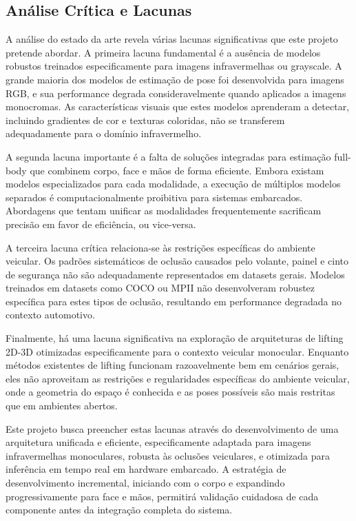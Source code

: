 \documentclass[12pt, a4paper]{article}
\begin{document}
\subsection{Análise Crítica e Lacunas}

A análise do estado da arte revela várias lacunas significativas que este projeto pretende abordar. A primeira lacuna fundamental é a ausência de modelos robustos treinados especificamente para imagens infravermelhas ou grayscale. A grande maioria dos modelos de estimação de pose foi desenvolvida para imagens RGB, e sua performance degrada consideravelmente quando aplicados a imagens monocromas. As características visuais que estes modelos aprenderam a detectar, incluindo gradientes de cor e texturas coloridas, não se transferem adequadamente para o domínio infravermelho.

A segunda lacuna importante é a falta de soluções integradas para estimação full-body que combinem corpo, face e mãos de forma eficiente. Embora existam modelos especializados para cada modalidade, a execução de múltiplos modelos separados é computacionalmente proibitiva para sistemas embarcados. Abordagens que tentam unificar as modalidades frequentemente sacrificam precisão em favor de eficiência, ou vice-versa.

A terceira lacuna crítica relaciona-se às restrições específicas do ambiente veicular. Os padrões sistemáticos de oclusão causados pelo volante, painel e cinto de segurança não são adequadamente representados em datasets gerais. Modelos treinados em datasets como COCO ou MPII não desenvolveram robustez específica para estes tipos de oclusão, resultando em performance degradada no contexto automotivo.

Finalmente, há uma lacuna significativa na exploração de arquiteturas de lifting 2D-3D otimizadas especificamente para o contexto veicular monocular. Enquanto métodos existentes de lifting funcionam razoavelmente bem em cenários gerais, eles não aproveitam as restrições e regularidades específicas do ambiente veicular, onde a geometria do espaço é conhecida e as poses possíveis são mais restritas que em ambientes abertos.

Este projeto busca preencher estas lacunas através do desenvolvimento de uma arquitetura unificada e eficiente, especificamente adaptada para imagens infravermelhas monoculares, robusta às oclusões veiculares, e otimizada para inferência em tempo real em hardware embarcado. A estratégia de desenvolvimento incremental, iniciando com o corpo e expandindo progressivamente para face e mãos, permitirá validação cuidadosa de cada componente antes da integração completa do sistema.
\end{document}

